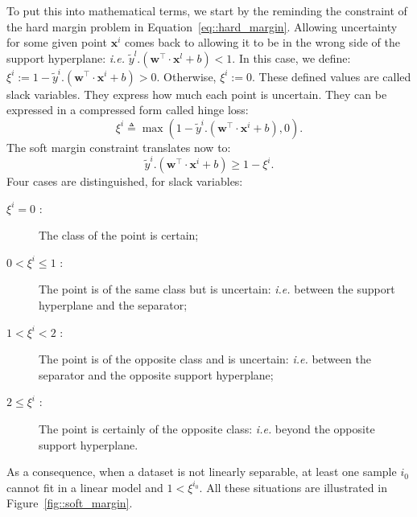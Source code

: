                 To put this into mathematical terms, we start by the reminding the constraint of the hard margin problem in Equation~\ref{eq::hard_margin}.
                Allowing uncertainty for some given point $\bm{x}^i$ comes back to allowing it to be in the wrong side of the support hyperplane: \textit{i.e.} $\tilde{y}^l.(\bm{w}^\intercal\cdot\bm{x}^l + b) < 1$.
                In this case, we define: $\xi^i := 1 - \tilde{y}^i.(\bm{w}^\intercal\cdot\bm{x}^i + b) > 0$.
                Otherwise, $\xi^i := 0$.
                These defined values are called slack variables.
                They express how much each point is uncertain.
                They can be expressed in a compressed form called hinge loss:
                \begin{equation}
                    \label{eq::slack_variables}
                    \xi^i \triangleq \max\left(1 - \tilde{y}^i.(\bm{w}^\intercal\cdot\bm{x}^i + b), 0\right).
                \end{equation}
                The soft margin constraint translates now to:
                \begin{equation}
                    \label{eq::soft_margin}
                    \tilde{y}^i.(\bm{w}^\intercal\cdot\bm{x}^i + b) \geq 1 - \xi^i.
                \end{equation}
                Four cases are distinguished, for slack variables:
                \begin{description}
                    \item[$\xi^i = 0$ :] The class of the point is certain;
                    \item[$0 < \xi^i \leq 1$ :] The point is of the same class but is uncertain: \textit{i.e.} between the support hyperplane and the separator;
                    \item[$1 < \xi^i < 2$ :] The point is of the opposite class and is uncertain: \textit{i.e.} between the separator and the opposite support hyperplane;
                    \item[$2 \leq \xi^i$ :] The point is certainly of the opposite class: \textit{i.e.} beyond the opposite support hyperplane.
                \end{description}
                As a consequence, when a dataset is not linearly separable, at least one sample $i_0$ cannot fit in a linear model and $1 < \xi^{i_0}$.
                All these situations are illustrated in Figure~\ref{fig::soft_margin}.\\

